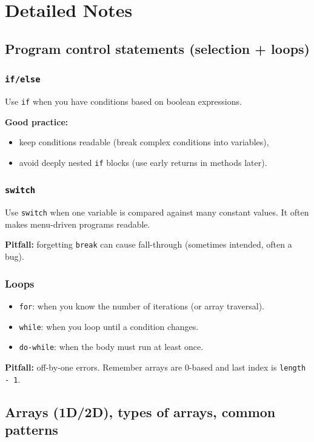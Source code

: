 \documentclass[11pt]{article}
\begin{document}
\section{Detailed Notes}
\subsection{Program control statements (selection + loops)}
\subsubsection{\texttt{if/else}}
Use \texttt{if} when you have conditions based on boolean expressions.

\textbf{Good practice:}
\begin{itemize}
  \item keep conditions readable (break complex conditions into variables),
  \item avoid deeply nested \texttt{if} blocks (use early returns in methods later).
\end{itemize}

\subsubsection{\texttt{switch}}
Use \texttt{switch} when one variable is compared against many constant values.
It often makes menu-driven programs readable.

\textbf{Pitfall:} forgetting \texttt{break} can cause fall-through (sometimes intended, often a bug).

\subsubsection{Loops}
\begin{itemize}
  \item \texttt{for}: when you know the number of iterations (or array traversal).
  \item \texttt{while}: when you loop until a condition changes.
  \item \texttt{do-while}: when the body must run at least once.
\end{itemize}
\textbf{Pitfall:} off-by-one errors. Remember arrays are 0-based and last index is \texttt{length - 1}.

\subsection{Arrays (1D/2D), types of arrays, common patterns}
\end{document}
